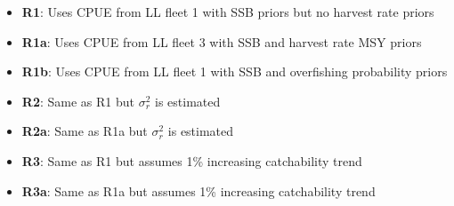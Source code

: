 \documentclass[11pt]{article}
\newcommand{\sigr}{\sigma^2_r}
\begin{document}
\begin{itemize}
    \item \textbf{R1}: Uses CPUE from LL fleet 1 with SSB priors but no harvest rate priors
    \item \textbf{R1a}: Uses CPUE from LL fleet 3 with SSB and harvest rate MSY priors
    \item \textbf{R1b}: Uses CPUE from LL fleet 1 with SSB and overfishing probability priors
    \item \textbf{R2}: Same as R1 but $\sigr$ is estimated 
    \item \textbf{R2a}: Same as R1a but $\sigr$ is estimated
    \item \textbf{R3}: Same as R1 but assumes 1\% increasing catchability trend
    \item \textbf{R3a}: Same as R1a but assumes 1\% increasing catchability trend
\end{itemize}
\end{document}

